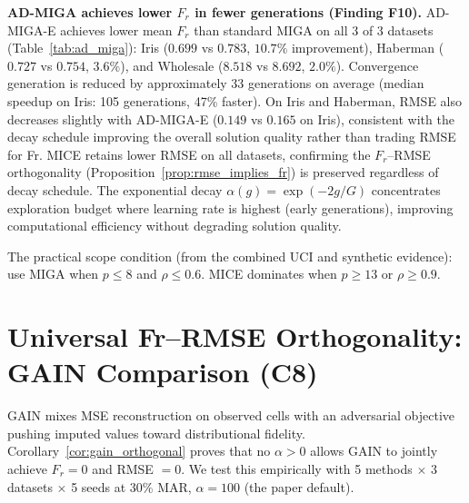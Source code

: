 \textbf{AD-MIGA achieves lower $F_r$ in fewer generations (Finding F10).} AD-MIGA-E achieves lower mean $F_r$ than standard MIGA on all 3 of 3 datasets (Table~\ref{tab:ad_miga}): Iris ($0.699$ vs $0.783$, $10.7\%$ improvement), Haberman ($0.727$ vs $0.754$, $3.6\%$), and Wholesale ($8.518$ vs $8.692$, $2.0\%$). Convergence generation is reduced by approximately 33 generations on average (median speedup on Iris: 105 generations, 47\% faster). On Iris and Haberman, RMSE also decreases slightly with AD-MIGA-E ($0.149$ vs $0.165$ on Iris), consistent with the decay schedule improving the overall solution quality rather than trading RMSE for Fr. MICE retains lower RMSE on all datasets, confirming the $F_r$--RMSE orthogonality (Proposition~\ref{prop:rmse_implies_fr}) is preserved regardless of decay schedule. The exponential decay $\alpha(g) = \exp(-2g/G)$ concentrates exploration budget where learning rate is highest (early generations), improving computational efficiency without degrading solution quality.

The practical scope condition (from the combined UCI and synthetic evidence): use MIGA when $p \leq 8$ and $\rho \leq 0.6$. MICE dominates when $p \geq 13$ or $\rho \geq 0.9$.

\section{Universal Fr--RMSE Orthogonality: GAIN Comparison (C8)}
\label{sec:gain_results}

GAIN \cite{Yoon2018} mixes MSE reconstruction on observed cells with an adversarial objective pushing imputed values toward distributional fidelity. Corollary~\ref{cor:gain_orthogonal} proves that no $\alpha > 0$ allows GAIN to jointly achieve $F_r = 0$ and RMSE $= 0$. We test this empirically with 5 methods $\times$ 3 datasets $\times$ 5 seeds at 30\% MAR, $\alpha=100$ (the paper default).

